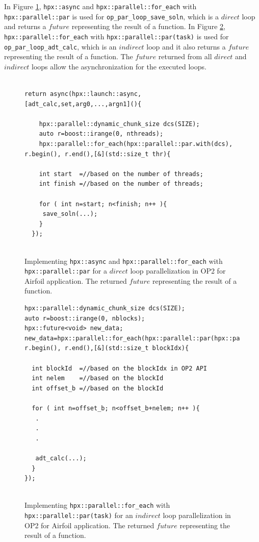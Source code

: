 \documentclass[conference]{IEEEtran}
\begin{document}
In Figure \ref{l6}, \texttt{hpx::async} and \texttt{hpx::parallel::for\_each} with \texttt{hpx::parallel::par} is used for \texttt{op\_par\_loop\_save\_soln}, which is a $direct$ loop and returns a $future$ representing the result of a function. In Figure \ref{l6b},  \texttt{hpx::parallel::for\_each} with \texttt{hpx::parallel::par(task)} is used for \texttt{op\_par\_loop\_adt\_calc}, which is an $indirect$ loop and it also returns a $future$ representing the result of a function. The $future$ returned from all $direct$ and $indirect$ loops allow the asynchronization for the executed loops.

\begin{figure} 
    \begin{lstlisting}    

return async(hpx::launch::async,[adt_calc,set,arg0,...,argn1](){

    hpx::parallel::dynamic_chunk_size dcs(SIZE);
    auto r=boost::irange(0, nthreads);
    hpx::parallel::for_each(hpx::parallel::par.with(dcs), r.begin(), r.end(),[&](std::size_t thr){
  
    int start  =//based on the number of threads;
    int finish =//based on the number of threads;
        
    for ( int n=start; n<finish; n++ ){
     save_soln(...);
    }
  });
  
    \end{lstlisting}
    \caption{\small{Implementing \texttt{hpx::async} and \texttt{hpx::parallel::for\_each} with \texttt{hpx::parallel::par} for a $direct$ loop parallelization in OP2 for Airfoil application. The returned $future$ representing the result of a function.}}
    \label{l6}
\end{figure}


\begin{figure} 
    \begin{lstlisting}    
hpx::parallel::dynamic_chunk_size dcs(SIZE);
auto r=boost::irange(0, nblocks);
hpx::future<void> new_data;
new_data=hpx::parallel::for_each(hpx::parallel::par(hpx::parallel::task).with(dcs), r.begin(), r.end(),[&](std::size_t blockIdx){
  
  int blockId  =//based on the blockIdx in OP2 API
  int nelem    =//based on the blockId 
  int offset_b =//based on the blockId
        
  for ( int n=offset_b; n<offset_b+nelem; n++ ){
   .
   .
   .

   adt_calc(...);
  }
});
  
    \end{lstlisting}
    \caption{\small{Implementing \texttt{hpx::parallel::for\_each} with \texttt{hpx::parallel::par(task)} for an $indirect$ loop parallelization in OP2 for Airfoil application. The returned $future$ representing the result of a function.}}
    \label{l6b}
\end{figure}
\end{document}
